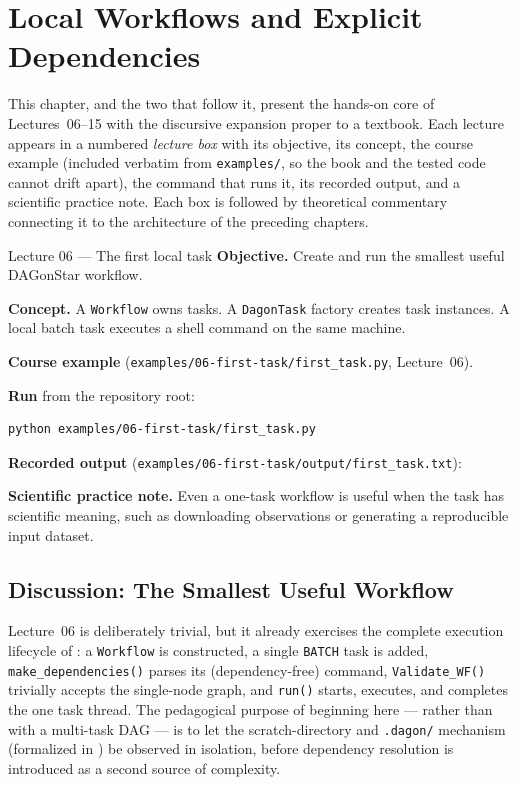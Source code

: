\chapter{Local Workflows and Explicit Dependencies}
\label{ch:lessons-01-02}

This chapter, and the two that follow it, present the hands-on core of
Lectures~06--15 with the discursive expansion proper to a textbook. Each
lecture appears in a numbered \emph{lecture box} with its objective, its
concept, the course example (included verbatim from \texttt{examples/}, so the
book and the tested code cannot drift apart), the command that runs it, its
recorded output, and a scientific practice note. Each box is followed by
theoretical commentary connecting it to the architecture of the preceding
chapters.

\begin{lessonbox}{Lecture 06 --- The first local task}
\textbf{Objective.} Create and run the smallest useful DAGonStar workflow.

\textbf{Concept.} A \texttt{Workflow} owns tasks. A \texttt{DagonTask}
factory creates task instances. A local batch task executes a shell command
on the same machine.

\textbf{Course example} (\texttt{examples/06-first-task/first\_task.py}, Lecture~06).


\textbf{Run} from the repository root:
\begin{lstlisting}[style=bash]
python examples/06-first-task/first_task.py
\end{lstlisting}

\textbf{Recorded output} (\texttt{examples/06-first-task/output/first\_task.txt}):


\textbf{Scientific practice note.} Even a one-task workflow is useful when
the task has scientific meaning, such as downloading observations or
generating a reproducible input dataset.
\end{lessonbox}

\section{Discussion: The Smallest Useful Workflow}

Lecture~06 is deliberately trivial, but it already exercises the complete
execution lifecycle of : a \texttt{Workflow} is
constructed, a single \texttt{BATCH} task is added, \texttt{make\_dependencies()}
parses its (dependency-free) command, \texttt{Validate\_WF()} trivially
accepts the single-node graph, and \texttt{run()} starts, executes, and
completes the one task thread. The pedagogical purpose of beginning here ---
rather than with a multi-task DAG --- is to let the scratch-directory and
\texttt{.dagon/} mechanism (formalized in ) be observed
in isolation, before dependency resolution is introduced as a second source
of complexity.

